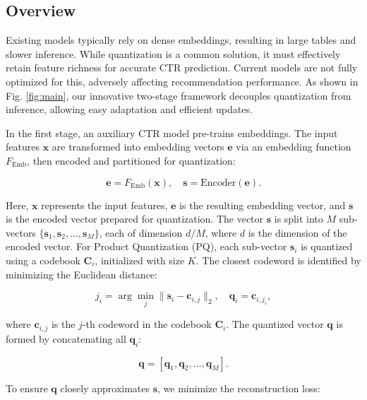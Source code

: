\subsection{Overview}
Existing models typically rely on dense embeddings, resulting in large tables and slower inference. While quantization is a common solution, it must effectively retain feature richness for accurate CTR prediction. Current models are not fully optimized for this, adversely affecting recommendation performance. As shown in Fig. \ref{fig:main}, our innovative two-stage framework decouples quantization from inference, allowing easy adaptation and efficient updates.

In the first stage, an auxiliary CTR model pre-trains embeddings. The input features $\mathbf{x}$ are transformed into embedding vectors $\mathbf{e}$ via an embedding function $F_{\text{Emb}}$, then encoded and partitioned for quantization:

\begin{equation}  
\mathbf{e} = F_{\text{Emb}}(\mathbf{x}), \quad \mathbf{s} = \text{Encoder}(\mathbf{e}).
\end{equation}  

Here, $\mathbf{x}$ represents the input features, $\mathbf{e}$ is the resulting embedding vector, and $\mathbf{s}$ is the encoded vector prepared for quantization. The vector $\mathbf{s}$ is split into $M$ sub-vectors $\{\mathbf{s}_1, \mathbf{s}_2, \ldots, \mathbf{s}_M\}$, each of dimension $d/M$, where $d$ is the dimension of the encoded vector. For Product Quantization (PQ), each sub-vector $\mathbf{s}_i$ is quantized using a codebook $\mathbf{C}_i$, initialized with size $K$. The closest codeword is identified by minimizing the Euclidean distance:

\begin{equation}  
j_i = \arg \min_j \| \mathbf{s}_i - \mathbf{c}_{i,j} \|_2, \quad \mathbf{q}_i = \mathbf{c}_{i,j_i},
\end{equation}  

where $\mathbf{c}_{i,j}$ is the $j$-th codeword in the codebook $\mathbf{C}_i$. The quantized vector $\mathbf{q}$ is formed by concatenating all $\mathbf{q}_i$:

\begin{equation}  
\mathbf{q} = [\mathbf{q}_{1}, \mathbf{q}_{2}, \ldots, \mathbf{q}_{M}].
\end{equation}  

To ensure $\mathbf{q}$ closely approximates $\mathbf{s}$, we minimize the reconstruction loss:

